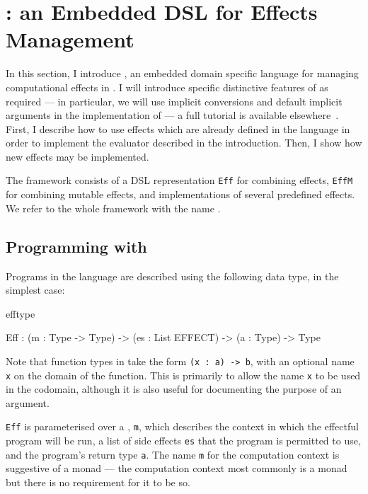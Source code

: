 \section{\Eff{}: an Embedded DSL for Effects Management} 

In this section, I introduce \Eff{}, an embedded domain specific language
for managing computational effects in \Idris{}. I will introduce specific
distinctive features of \Idris{} as required --- in particular, we will
use implicit conversions and default implicit arguments in the implementation
of \Eff{} --- a full tutorial is available elsewhere~\cite{idristutorial}.  
First, I describe how to
use effects which are already defined in the language in order to
implement the evaluator described in the introduction. Then, I show how new
effects may be implemented. 

The framework consists of a DSL representation \texttt{Eff} for combining
effects, \texttt{EffM} for combining mutable effects, and implementations
of several predefined effects. We refer to the whole framework with the
name \Eff{}.

\label{sect:effdsl}

\subsection{Programming with \Eff{}}

Programs in the \Eff{} language are described using the following data type,
in the simplest case:

\begin{SaveVerbatim}{efftype}

Eff : (m  : Type -> Type) -> 
      (es : List EFFECT) -> (a  : Type) -> Type

\end{SaveVerbatim}

\noindent
Note that function types in \Idris{} take the form \texttt{(x : a) -> b}, with
an optional name \texttt{x} on the domain of the function. This is primarily
to allow the name \texttt{x} to be used in the codomain, although it is also
useful for documenting the purpose of an argument.

\texttt{Eff} is parameterised over a , \texttt{m}, which
describes the context in which the effectful program will be run, a list
of side effects \texttt{es} that the program is permitted to use, 
and the program's return type \texttt{a}. The name \texttt{m} for the computation
context is suggestive of a monad --- the computation context most commonly 
is a monad but there is no requirement for it to be so.

